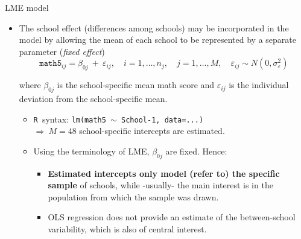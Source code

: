 \documentclass{beamer}
\newcommand{\Rko}{\texttt{R~}}
\begin{document}
\begin{frame}{LME model}
\begin{itemize}
\item The school effect (differences among schools) may be incorporated in the model by allowing the mean of each school to be represented by a separate parameter (\textit{fixed effect})
$$ \texttt{math5}_{ij} = \beta_{0j}~+~\varepsilon_{ij}, \quad i=1,\dots,n_j,  \quad j=1,\dots, M,  \quad \varepsilon_{ij} \sim N(0,\sigma^2_{\varepsilon}) $$

where $\beta_{0j}$ is the school-specific mean math score and
$\varepsilon_{ij}$ is the individual deviation from the school-specific mean.\\
\smallskip
\begin{itemize}
\item \Rko syntax: \texttt{lm(math5 $\sim$ School-1, data=...)}\\
$\Rightarrow~M=48$ school-specific intercepts are estimated.\\
\medskip
\item Using the terminology of LME, $\beta_{0j}$ are fixed. Hence:\\
\begin{itemize}
    \item \textbf{Estimated intercepts only model (refer to) the specific sample}  of schools, while -usually- the main interest is in the population from which the sample was drawn. \smallskip
    \item OLS regression does not provide an estimate of the between-school variability, which is also of central interest.
\end{itemize}
\end{itemize}
\end{itemize}
\end{frame}
\end{document}

